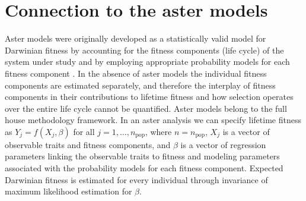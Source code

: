 \documentclass[11pt]{article}
\newcommand{\npop}{n_{\text{pop}}}
\newcommand{\nsys}{n}
\begin{document}
\section{Connection to the aster models}

Aster models were originally developed as a statistically valid model for Darwinian fitness by accounting for the fitness components (life cycle) of the system under study and by employing appropriate probability models for each fitness component \citep{geyer2007aster, shaw2008unifying}. In the absence of aster models the individual fitness components are estimated separately, and therefore the interplay of fitness components in their contributions to lifetime fitness and how selection operates over the entire life cycle cannot be quantified. Aster models belong to the full house methodology framework. In an aster analysis we can specify lifetime fitness as $Y_j = f(X_j, \beta)$ for all $j = 1,\ldots,\npop$, where $\nsys = \npop$, $X_j$ is a vector of observable traits and fitness components, and $\beta$ is a vector of regression parameters linking the observable traits to fitness and modeling parameters associated with the probability models for each fitness component. Expected Darwinian fitness is estimated for every individual through invariance of maximum likelihood estimation for $\beta$.
\end{document}
